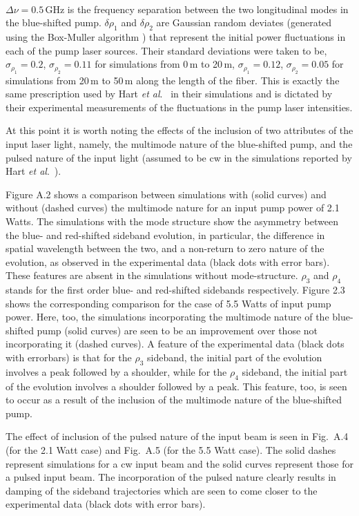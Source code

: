 \

\noindent $\Delta\nu = 0.5$\,GHz is the frequency separation between the two longitudinal
modes in the blue-shifted pump. $\delta\rho_1$ and $\delta\rho_2$ are
Gaussian random deviates (generated using the Box-Muller algorithm
\cite{boxmuller}) that represent the initial power fluctuations in each of the
pump laser sources. Their standard deviations were taken to be,
$\sigma_{\rho_1} = 0.2$, $\sigma_{\rho_2} = 0.11$ for simulations from 0\,m to
20\,m, $\sigma_{\rho_1} = 0.12$, $\sigma_{\rho_2} = 0.05$ for simulations from
20\,m to 50\,m along the length of the fiber. This is exactly the same
prescription used by Hart {\it et al}.\ \cite{hart1} in their simulations and is
dictated by their experimental measurements of the fluctuations in the pump
laser intensities.

At this point it is worth noting the effects of the inclusion of two attributes of
the input laser light, namely, the multimode nature of the blue-shifted pump, and
the pulsed nature of the input light (assumed to be cw in the simulations reported by
Hart {\it et al}.\ \cite{hart1}).

Figure A.2 shows a comparison between simulations with (solid curves) and without (dashed curves) the multimode nature for an input pump power of 2.1 Watts. The simulations with the mode structure show the asymmetry between the blue- and red-shifted sideband evolution, in particular, the difference in spatial wavelength between the two, and a non-return to zero nature of the evolution, as observed in the experimental data (black dots with error bars). These features are absent in the simulations without mode-structure. $\rho_3$ and $\rho_4$ stands for the first order blue- and red-shifted sidebands respectively.  Figure 2.3 shows the corresponding comparison for the case of 5.5 Watts of input pump power.  Here, too, the simulations incorporating the multimode nature of the blue-shifted pump (solid curves) are seen to be an improvement over those not incorporating it (dashed curves). A feature of the experimental data (black dots with errorbars) is that for the $\rho_3$ sideband, the initial part of the evolution involves a peak followed by a shoulder, while for the $\rho_4$ sideband, the initial part of the evolution involves a shoulder followed by a peak. This feature, too, is seen to occur as a result of the inclusion of the multimode nature of the blue-shifted pump.

The effect of inclusion of the pulsed nature of the input beam is seen in Fig.\ A.4 (for the 2.1 Watt case) and Fig.\ A.5 (for the 5.5 Watt case). The solid dashes represent simulations for a cw input beam and the solid curves represent those for a pulsed input beam. The incorporation of the pulsed nature clearly results in damping of the sideband trajectories which are seen to come closer to the experimental data \cite{hart1} (black dots with error bars).

